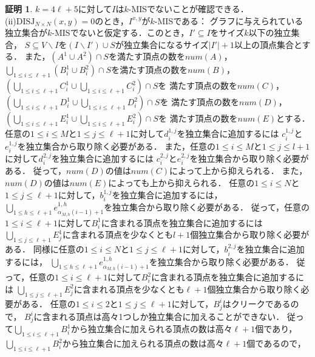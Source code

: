 \documentclass[12pt]{thesis}
\theoremstyle{definition}
\newtheorem*{prf*}{証明}
\begin{document}
\begin{prf*}
$k=4\ell+5$に対して$I$は$k$-MISでないことが確認できる． \\
(ii)$\mathrm{DISJ}_{N \times N} (x, y) = 0$のとき，$I^{x,y}$が$k$-MISである：
グラフに与えられている独立集合が$k$-MISでないと仮定する．このとき，$I'\subseteq I$をサイズ$k$以下の独立集合，
$S\subseteq V\backslash I$を$(I \backslash I') \cup S$が独立集合になるサイズ$|I'|+1$以上の頂点集合とする．
また，$(A^{1}\cup A^{2}) \cap S$を満たす頂点の数を$\mathit{num}(A)$，
$\bigcup_{1\leq i \leq \ell+1}(B_{i}^{1} \cup B_{i}^{2}) \cap S$を満たす頂点の数を$\mathit{num}(B)$，
$\left(\bigcup_{1\leq i \leq \ell+1}C_{i}^{1} \cup \bigcup_{1\leq i \leq \ell+1}C_{i}^{2}\right) \cap S$を
満たす頂点の数を$\mathit{num}(C)$，
$\left(\bigcup_{1\leq i \leq \ell+1}D_{i}^{1} \cup \bigcup_{1\leq i \leq \ell+1}D_{i}^{2}\right) \cap S$を
満たす頂点の数を$\mathit{num}(D)$，
$\left(\bigcup_{1\leq i \leq \ell+1}E_{i}^{1} \cup \bigcup_{1\leq i \leq \ell+1}E_{i}^{2}\right) \cap S$を
満たす頂点の数を$\mathit{num}(E)$とする．
任意の$1\leq i \leq M$と$1\leq j \leq \ell+1$に対して$d^{1,j}_{i}$を独立集合に追加するには
$c^{1,j}_{i}$と$e^{1,j}_{i}$を独立集合から取り除く必要がある．
また，任意の$1\leq i \leq M$と$1\leq j \leq l+1$に対して$d^{2,j}_{i}$を独立集合に追加するには
$c^{2,j}_{i}$と$e^{2,j}_{i}$を独立集合から取り除く必要がある．
従って，$\mathit{num}(D)$の値は$\mathit{num}(C)$によって上から抑えられる．
また，$\mathit{num}(D)$の値は$num(E)$によっても上から抑えられる．
任意の$1\leq i \leq N$と$1\leq j \leq \ell+1$に対して，$b^{1,j}_{i}$を独立集合に追加するには，
$\bigcup_{1\leq h \leq \ell+1} e^{1,h}_{\alpha_{M,h}(i-1)+1}$を独立集合から取り除く必要がある．
従って，任意の$1\leq i \leq \ell+1$に対して$B^{1}_{i}$に含まれる頂点を独立集合に追加するには
$\bigcup_{1\leq j \leq \ell+1}E^{1}_{j}$に含まれる頂点を少なくとも$l+1$個独立集合から取り除く必要がある．
同様に任意の$1\leq i \leq N$と$1\leq j \leq \ell+1$に対して，$b^{2,j}_{i}$を独立集合に追加するには，
$\bigcup_{1\leq h \leq \ell+1} e^{1,h}_{\alpha_{M,h}(i-1)+1}$を独立集合から取り除く必要がある．
従って，任意の$1\leq i \leq \ell+1$に対して$B^{2}_{i}$に含まれる頂点を独立集合に追加するには
$\bigcup_{1\leq j \leq \ell+1}E^{2}_{j}$に含まれる頂点を少なくとも$\ell+1$個独立集合から取り除く必要がある．
任意の$1\leq i \leq 2$と$1\leq j \leq \ell+1$に対して，$B^{i}_{j}$はクリークであるので，
$B^{i}_{j}$に含まれる頂点は高々1つしか独立集合に加えることができない．
従って$\bigcup_{1\leq i \leq \ell+1}B^{1}_{i}$から独立集合に加えられる頂点の数は高々$\ell+1$個であり，
$\bigcup_{1\leq i \leq \ell+1}B^{2}_{i}$から独立集合に加えられる頂点の数は高々$\ell+1$個であるので，

\end{prf*}
\end{document}
